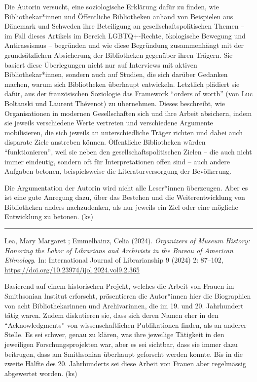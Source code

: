\documentclass[a4paper,
fontsize=11pt,
oneside,
numbers=noperiodatend,
parskip=half-,
bibliography=totoc,
final
]{scrartcl}
\begin{document}
Die Autorin versucht, eine soziologische Erklärung dafür zu finden, wie
Bibliothekar*innen und Öffentliche Bibliotheken anhand von Beispielen
aus Dänemark und Schweden ihre Beteiligung an gesellschaftspolitischen
Themen – im Fall dieses Artikels im Bereich LGBTQ+-Rechte, ökologische
Bewegung und Antirassismus – begründen und wie diese Begründung
zusammenhängt mit der grundsätzlichen Absicherung der Bibliotheken
gegenüber ihren Trägern. Sie basiert diese Überlegungen nicht nur auf
Interviews mit aktiven Bibliothekar*innen, sondern auch auf Studien, die
sich darüber Gedanken machen, warum sich Bibliotheken überhaupt
entwickeln. Letztlich plädiert sie dafür, aus der französischen
Soziologie das Framework \enquote{orders of worth} (von Luc Boltanski
und Laurent Thévenot) zu übernehmen. Dieses beschreibt, wie
Organisationen in modernen Gesellschaften sich und ihre Arbeit
absichern, indem sie jeweils verschiedene Werte vertreten und
verschiedene Argumente mobilisieren, die sich jeweils an
unterschiedliche Träger richten und dabei auch disparate Ziele anstreben
können. Öffentliche Bibliotheken würden \enquote{funktionieren}, weil
sie neben den gesellschaftspolitischen Zielen – die auch nicht immer
eindeutig, sondern oft für Interpretationen offen sind – auch andere
Aufgaben betonen, beispielsweise die Literaturversorgung der
Bevölkerung.

Die Argumentation der Autorin wird nicht alle Leser*innen überzeugen.
Aber es ist eine gute Anregung dazu, über das Bestehen und die
Weiterentwicklung von Bibliotheken anders nachzudenken, als nur jeweils
ein Ziel oder eine mögliche Entwicklung zu betonen. (ks)

\begin{center}\rule{0.5\linewidth}{0.5pt}\end{center}

Lea, Mary Margaret ; Emmelhainz, Celia (2024). \emph{Organizers of
Museum History: Honoring the Labor of Librarians and Archivists in the
Bureau of American Ethnology}. In: International Journal of
Librarianship 9 (2024) 2: 87--102,
\url{https://doi.org/10.23974/ijol.2024.vol9.2.365}

Basierend auf einem historischen Projekt, welches die Arbeit von Frauen
im Smithsonian Institut erforscht, präsentieren die Autor*innen hier die
Biographien von acht Bibliothekarinnen und Archivarinnen, die im 19. und
20. Jahrhundert tätig waren. Zudem diskutieren sie, dass sich deren
Namen eher in den \enquote{Acknowledgments} von wissenschaftlichen
Publikationen finden, als an anderer Stelle. Es sei schwer, genau zu
klären, was ihre jeweilige Tätigkeit in den jeweiligen
Forschungsprojekten war, aber es sei sichtbar, dass sie immer dazu
beitrugen, dass am Smithsonian überhaupt geforscht werden konnte. Bis in
die zweite Hälfte des 20. Jahrhunderts sei diese Arbeit von Frauen aber
regelmässig abgewertet worden. (ks)
\end{document}
